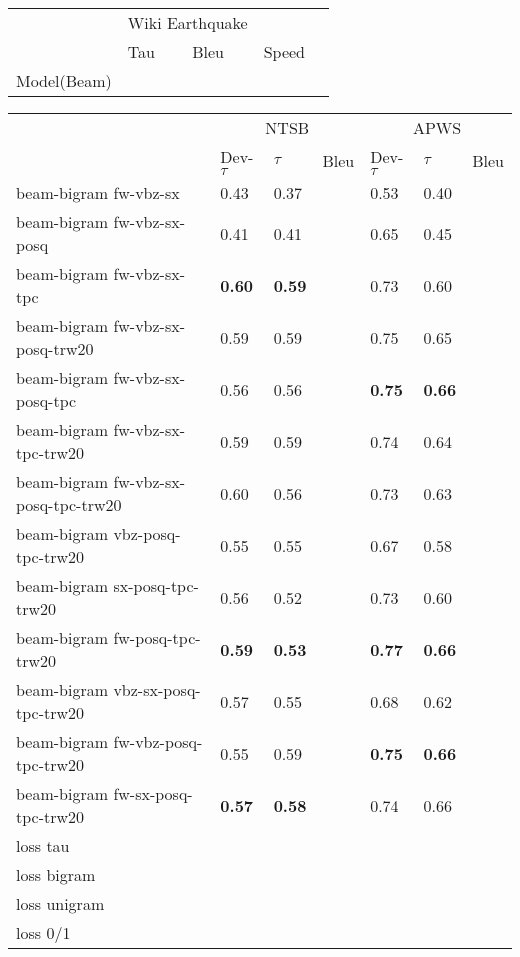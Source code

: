 \begin{table*}
  \centering
  \begin{tabular}{|l|ll|ll|}
    \hline
    & \multicolumn{2}{c|}{Wiki Earthquake} \\
    & Tau & Bleu & Speed & \\
    \hline
    Model(Beam) & & \\
    \hline
  \end{tabular}
\end{table*}

\begin{table*}
  \centering
  \begin{tabular}{|l|lll|lll|}
    \hline
    & \multicolumn{3}{c|}{NTSB} &\multicolumn{3}{c|}{APWS} \\
    &Dev-$\tau$ & $\tau$ & Bleu &Dev-$\tau$ & $\tau$ & Bleu \\
    \hline
    beam-bigram fw-vbz-sx &0.43 &0.37 & & 0.53 & 0.40 & \\
    beam-bigram fw-vbz-sx-posq &0.41 &0.41 & & 0.65 & 0.45 & \\
    beam-bigram fw-vbz-sx-tpc &\textbf{0.60} &\textbf{0.59} & & 0.73 & 0.60 & \\  
    beam-bigram fw-vbz-sx-posq-trw20 &0.59 &0.59 & & 0.75 & 0.65 & \\
    beam-bigram fw-vbz-sx-posq-tpc  &0.56 &0.56 & & \textbf{0.75}  & \textbf{0.66} & \\
    beam-bigram fw-vbz-sx-tpc-trw20 &0.59 &0.59 & & 0.74 & 0.64 & \\
    beam-bigram fw-vbz-sx-posq-tpc-trw20 &0.60 &0.56 & &  0.73  & 0.63 & \\
    \hline 
    beam-bigram vbz-posq-tpc-trw20 &0.55 &0.55 & & 0.67 & 0.58 & \\ 
    beam-bigram sx-posq-tpc-trw20 &0.56 &0.52 & & 0.73 & 0.60 & \\
    beam-bigram fw-posq-tpc-trw20 &\textbf{0.59} &\textbf{0.53} & & \textbf{0.77} & \textbf{0.66} & \\
    \hline
    beam-bigram vbz-sx-posq-tpc-trw20 &0.57 &0.55 & & 0.68 &0.62 & \\
    beam-bigram fw-vbz-posq-tpc-trw20 &0.55 &0.59 & & \textbf{0.75} &\textbf{0.66}& \\
    beam-bigram fw-sx-posq-tpc-trw20  &\textbf{0.57} &\textbf{0.58} & & 0.74 &0.66 & \\
    \hline 
    \hline
    loss tau \\
    loss bigram \\
    loss unigram \\
    loss 0/1 \\
    \hline
  \end{tabular}
\end{table*}

